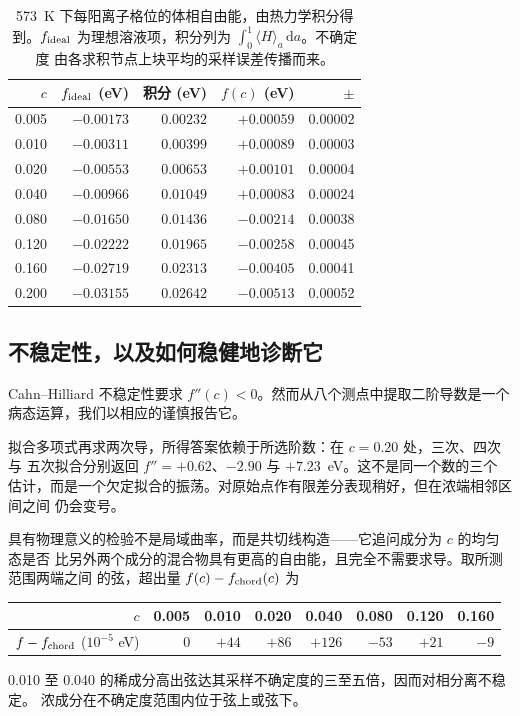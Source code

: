 \documentclass[11pt,a4paper]{ctexart}
\begin{document}
\begin{table}[htbp]
\centering
\caption{573~K 下每阳离子格位的体相自由能，由热力学积分得到。$f_{\rm ideal}$
为理想溶液项，积分列为 $\int_0^1 \langle H\rangle_a\,\mathrm{d}a$。不确定度
由各求积节点上块平均的采样误差传播而来。}
\label{tab:fofc}
\small
\begin{tabular}{rrrrr}
\toprule
$c$ & $f_{\rm ideal}$ (eV) & 积分 (eV) & $f(c)$ (eV) & $\pm$ \\
\midrule
0.005 & $-0.00173$ & $0.00232$ & $+0.00059$ & 0.00002 \\
0.010 & $-0.00311$ & $0.00399$ & $+0.00089$ & 0.00003 \\
0.020 & $-0.00553$ & $0.00653$ & $+0.00101$ & 0.00004 \\
0.040 & $-0.00966$ & $0.01049$ & $+0.00083$ & 0.00024 \\
0.080 & $-0.01650$ & $0.01436$ & $-0.00214$ & 0.00038 \\
0.120 & $-0.02222$ & $0.01965$ & $-0.00258$ & 0.00045 \\
0.160 & $-0.02719$ & $0.02313$ & $-0.00405$ & 0.00041 \\
0.200 & $-0.03155$ & $0.02642$ & $-0.00513$ & 0.00052 \\
\bottomrule
\end{tabular}
\end{table}

\subsection{不稳定性，以及如何稳健地诊断它}
\label{sec:spinodal}

Cahn--Hilliard 不稳定性要求 $f''(c) < 0$。然而从八个测点中提取二阶导数是一个
病态运算，我们以相应的谨慎报告它。

拟合多项式再求两次导，所得答案依赖于所选阶数：在 $c = 0.20$ 处，三次、四次与
五次拟合分别返回 $f'' = +0.62$、$-2.90$ 与 $+7.23$~eV。这不是同一个数的三个
估计，而是一个欠定拟合的振荡。对原始点作有限差分表现稍好，但在浓端相邻区间之间
仍会变号。

具有物理意义的检验不是局域曲率，而是共切线构造——它追问成分为 $c$ 的均匀态是否
比另外两个成分的混合物具有更高的自由能，且完全不需要求导。取所测范围两端之间
的弦，超出量 $f(c) - f_{\rm chord}(c)$ 为
\begin{center}
\small
\begin{tabular}{rrrrrrrr}
\toprule
$c$ & 0.005 & 0.010 & 0.020 & 0.040 & 0.080 & 0.120 & 0.160 \\
\midrule
$f - f_{\rm chord}$ ($10^{-5}$ eV) & $0$ & $+44$ & $+86$ & $+126$ & $-53$ & $+21$ & $-9$ \\
\bottomrule
\end{tabular}
\end{center}
0.010 至 0.040 的稀成分高出弦达其采样不确定度的三至五倍，因而对相分离不稳定。
浓成分在不确定度范围内位于弦上或弦下。
\end{document}
